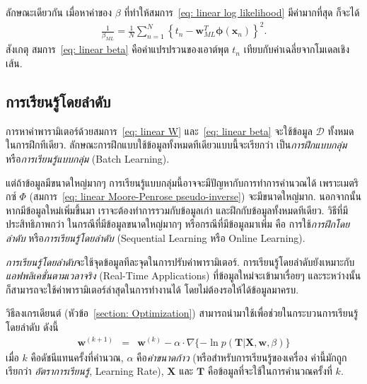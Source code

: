 ลักษณะเดียวกัน เมื่อหาค่าของ $\beta$ ที่ทำให้สมการ~\ref{eq: linear log likelihood} มีค่ามากที่สุด ก็จะได้
\begin{eqnarray}
   \frac{1}{\beta_{ML}} = \frac{1}{N} \sum_{n=1}^N \left\{ t_n - \mathbf{w}_{ML}^T \bm{\phi}(\mathbf{x}_n) \right\}^2.
\label{eq: linear beta}   
\end{eqnarray}
สังเกตุ สมการ~\ref{eq: linear beta} คือค่าแปรปรวนของเอาต์พุต $t_n$ เทียบกับค่าเฉลี่ยจากโมเดลเชิงเส้น.

\subsection{การเรียนรู้โดยลำดับ}
\label{section: sequential learning}

การหาค่าพารามิเตอร์ด้วยสมการ~\ref{eq: linear W} และ~\ref{eq: linear beta} 
จะใช้ข้อมูล $\mathcal{D}$ ทั้งหมดในการฝึกทีเดียว.
ลักษณะการฝึกแบบใช้ข้อมูลทั้งหมดทีเดียวแบบนี้จะเรียกว่า เป็น\textit{การฝึกแบบกลุ่ม} 
หรือ\textit{การเรียนรู้แบบกลุ่ม} (Batch Learning).
  

แต่ถ้าข้อมูลมีขนาดใหญ่มากๆ การเรียนรู้แบบกลุ่มนี้อาจจะมีปัญหากับการทำการคำนวณได้ 
เพราะเมตริกซ์ $\Phi$ (สมการ~\ref{eq: linear Moore-Penrose pseudo-inverse}) จะมีขนาดใหญ่มาก.
นอกจากนั้น หากมีข้อมูลใหม่เพิ่มขึ้นมา เราจะต้องทำการรวมกับข้อมูลเก่า และฝึกกับข้อมูลทั้งหมดทีเดียว.
วิธีที่มีประสิทธิภาพกว่า ในกรณีที่มีข้อมูลขนาดใหญ่มากๆ หรือกรณีที่มีข้อมูลมาเพิ่ม คือ การใช้\textit{การฝึกโดยลำดับ} หรือ\textit{การเรียนรู้โดยลำดับ} (Sequential Learning หรือ Online Learning).

\textit{การเรียนรู้โดยลำดับ}จะใช้จุดข้อมูลทีละจุดในการปรับค่าพารามิเตอร์.
การเรียนรู้โดยลำดับยังเหมาะกับ\textit{แอฟพลิเคชั่นตามเวลาจริง} (Real-Time Applications) ที่ข้อมูลใหม่จะเข้ามาเรื่อยๆ และระหว่างนั้นก็สามารถจะใช้ค่าพารามิเตอร์ล่าสุดในการทำงานได้ โดยไม่ต้องรอให้ได้ข้อมูลมาครบ.

วิธีลงเกรเดียนต์ (หัวข้อ~\ref{section: Optimization}) สามารถนำมาใช้เพื่อช่วยในกระบวนการเรียนรู้โดยลำดับ ดังนี้
\begin{eqnarray}
   \mathbf{w}^{(k+1)} &=& \mathbf{w}^{(k)} - \alpha \cdot \nabla \{- \ln p(\mathbf{T}|\mathbf{X}, \mathbf{w}, \beta) \}
\label{eq: linear w online}
\end{eqnarray}
เมื่อ $k$ คือดัชนีแทนครั้งที่คำนวณ, $\alpha$ คือ\textit{ค่าขนาดก้าว} 
(หรือสำหรับการเรียนรู้ของเครื่อง ค่านี้มักถูกเรียกว่า \textit{อัตราการเรียนรู้}, Learning Rate),
$\mathbf{X}$ และ $\mathbf{T}$ คือข้อมูลที่จะใช้ในการคำนวณครั้งที่ $k$.

